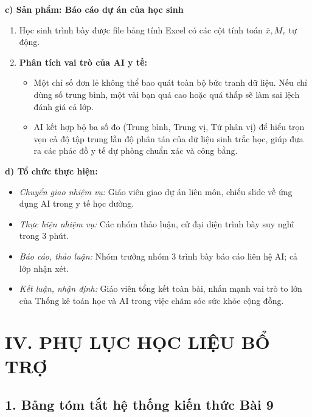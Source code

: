 \documentclass[12pt, a4paper]{article}
\begin{document}
\noindent \textbf{c) Sản phẩm: Báo cáo dự án của học sinh}
\begin{enumerate}[leftmargin=0.6cm]
    \item Học sinh trình bày được file bảng tính Excel có các cột tính toán $\bar{x}, M_e$ tự động.
    \item \textbf{Phân tích vai trò của AI y tế:}
    \begin{itemize}
        \item Một chỉ số đơn lẻ không thể bao quát toàn bộ bức tranh dữ liệu. Nếu chỉ dùng số trung bình, một vài bạn quá cao hoặc quá thấp sẽ làm sai lệch đánh giá cả lớp.
        \item AI kết hợp bộ ba số đo (Trung bình, Trung vị, Tứ phân vị) để hiểu trọn vẹn cả độ tập trung lẫn độ phân tán của dữ liệu sinh trắc học, giúp đưa ra các phác đồ y tế dự phòng chuẩn xác và công bằng.
    \end{itemize}
\end{enumerate}

\noindent \textbf{d) Tổ chức thực hiện:}
\begin{itemize}[leftmargin=0.8cm]
    \item \textit{Chuyển giao nhiệm vụ:} Giáo viên giao dự án liên môn, chiếu slide về ứng dụng AI trong y tế học đường.
    \item \textit{Thực hiện nhiệm vụ:} Các nhóm thảo luận, cử đại diện trình bày suy nghĩ trong 3 phút.
    \item \textit{Báo cáo, thảo luận:} Nhóm trưởng nhóm 3 trình bày báo cáo liên hệ AI; cả lớp nhận xét.
    \item \textit{Kết luận, nhận định:} Giáo viên tổng kết toàn bài, nhấn mạnh vai trò to lớn của Thống kê toán học và AI trong việc chăm sóc sức khỏe cộng đồng.
\end{itemize}

\section*{IV. PHỤ LỤC HỌC LIỆU BỔ TRỢ}

\subsection*{1. Bảng tóm tắt hệ thống kiến thức Bài 9}
\end{document}
